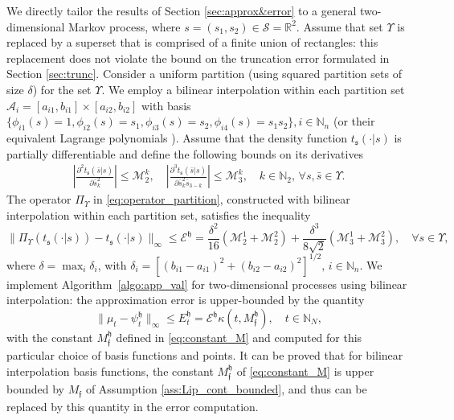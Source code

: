 \documentclass{LMCS}
\begin{document}
We directly tailor the results of Section \ref{sec:approx&error} to a general two-dimensional Markov process, 
where $s = (s_1,s_2)\in\mathcal S = \mathbb R^2$. 
Assume that set $\Upsilon$ is replaced by a superset that is comprised of a finite union of rectangles: 
this replacement does not violate the bound on the truncation error formulated in Section \ref{sec:trunc}.   
Consider a uniform partition (using squared partition sets of size $\delta$) for the set $\Upsilon$.  
We employ a bilinear interpolation within each partition set
$\mathcal A_i = [a_{i1},b_{i1}]\times[a_{i2},b_{i2}]$
with basis
$\{\phi_{i1}(s) = 1,\phi_{i2}(s) = s_1,\phi_{i3}(s) = s_2,\phi_{i4}(s) = s_1 s_2\},i\in\mathbb N_n$
(or their equivalent Lagrange polynomials \cite{SAH12}).
Assume that the density function $t_{\mathfrak s}(\cdot|s)$ is partially differentiable and define the following bounds on its derivatives
\begin{align*}
\left|\frac{\partial^2 t_{\mathfrak s}(\bar s|s)}{\partial \bar s_k^2}\right|\le\mathcal M_2^k,\quad 
\left|\frac{\partial^3 t_{\mathfrak s}(\bar s|s)}{\partial \bar s_k^2\bar s_{3-k}}\right|\le\mathcal M_3^k, \quad
k\in\mathbb N_2,\, \forall s,\bar s\in\Upsilon.
\end{align*}
The operator $\Pi_\Upsilon$ in \eqref{eq:operator_partition}, 
constructed with bilinear interpolation within each partition set, 
satisfies the inequality
\begin{equation*}
\|\Pi_{\Upsilon}\left(t_{\mathfrak s}(\cdot|s)\right)-t_{\mathfrak s}(\cdot|s)\|_{\infty} \le \mathcal E^{\mathfrak h} = \frac{\delta^2}{16}\left(\mathcal M_2^1+\mathcal M_2^2\right)
+ \frac{\delta^3}{8\sqrt{2}}\left(\mathcal M_3^1+\mathcal M_3^2\right), 
\quad \forall s\in\Upsilon,
\end{equation*}
where $\delta = \max_i \delta_i$, 
with $\delta_i = \left[(b_{i1}-a_{i1})^2+(b_{i2}-a_{i2})^2\right]^{1/2},\,i\in\mathbb N_n.$
We implement Algorithm~\ref{algo:app_val} for two-dimensional processes using bilinear interpolation: 
the approximation error is upper-bounded by the quantity
\begin{equation*}
\|\mu_t-\psi_t^{\mathfrak h}\|_\infty\le E_t^{\mathfrak h} = \mathcal E^{\mathfrak h}\kappa(t,M_{\mathfrak f}^{\mathfrak h}), \quad t\in\mathbb N_N,
\end{equation*}
with the constant $M_{\mathfrak f}^{\mathfrak h}$ defined in \eqref{eq:constant_M} and computed for this particular choice of basis functions and points.
It can be proved that for bilinear interpolation basis functions,
the constant $M_{\mathfrak f}^{\mathfrak h}$ of \eqref{eq:constant_M} is upper bounded by $M_{\mathfrak f}$ of Assumption \ref{ass:Lip_cont_bounded}, and thus can be replaced by this quantity in the error computation.
\end{document}
